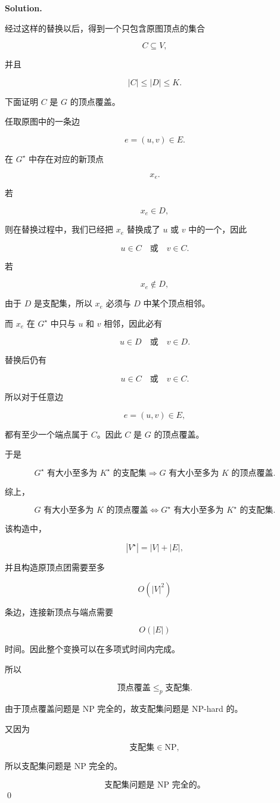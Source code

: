 \documentclass[11pt]{article}
\newenvironment{solution}{
\par\noindent\textbf{Solution.}\par\noindent
}{\qed}
\begin{document}
\begin{solution}
经过这样的替换以后，得到一个只包含原图顶点的集合

\[
C\subseteq V,
\]

并且

\[
|C|\leq |D|\leq K.
\]

下面证明 \(C\) 是 \(G\) 的顶点覆盖。

任取原图中的一条边

\[
e=(u,v)\in E.
\]

在 \(G^\star\) 中存在对应的新顶点

\[
x_e.
\]

若

\[
x_e\in D,
\]

则在替换过程中，我们已经把 \(x_e\) 替换成了 \(u\) 或 \(v\) 中的一个，因此

\[
u\in C \quad \text{或} \quad v\in C.
\]

若

\[
x_e\notin D,
\]

由于 \(D\) 是支配集，所以 \(x_e\) 必须与 \(D\) 中某个顶点相邻。

而 \(x_e\) 在 \(G^\star\) 中只与 \(u\) 和 \(v\) 相邻，因此必有

\[
u\in D \quad \text{或} \quad v\in D.
\]

替换后仍有

\[
u\in C \quad \text{或} \quad v\in C.
\]

所以对于任意边

\[
e=(u,v)\in E,
\]

都有至少一个端点属于 \(C\)。因此 \(C\) 是 \(G\) 的顶点覆盖。

于是

\[
G^\star \text{ 有大小至多为 } K^\star \text{ 的支配集}
\Rightarrow
G \text{ 有大小至多为 } K \text{ 的顶点覆盖}.
\]

综上，

\[
G \text{ 有大小至多为 } K \text{ 的顶点覆盖}
\iff
G^\star \text{ 有大小至多为 } K^\star \text{ 的支配集}.
\]

该构造中，

\[
|V^\star|=|V|+|E|,
\]

并且构造原顶点团需要至多

\[
O(|V|^2)
\]

条边，连接新顶点与端点需要

\[
O(|E|)
\]

时间。因此整个变换可以在多项式时间内完成。

所以

\[
\text{顶点覆盖}\leq_p \text{支配集}.
\]

由于顶点覆盖问题是 NP 完全的，故支配集问题是 NP-hard 的。

又因为

\[
\text{支配集}\in \mathrm{NP},
\]

所以支配集问题是 NP 完全的。

\[
\boxed{\text{支配集问题是 NP 完全的。}}
\]
\end{solution}
\end{document}
